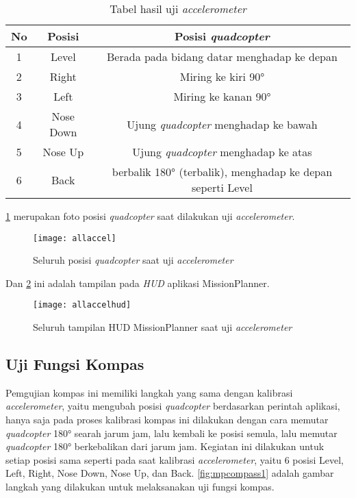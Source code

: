 \begin{table}[H]
	\caption{Tabel hasil uji \textit{accelerometer}}
	\label{tab:accel4}
	\centering
	\begin{tabular}{|c|c|c|}
		\hline
		\textbf{No} & \textbf{Posisi}    & \textbf{Posisi \textit{quadcopter}}                                          \\ \hline
		1  & Level     & Berada pada bidang datar menghadap ke depan                \\ \hline
		2  & Right     & Miring ke kiri 90°                                         \\ \hline
		3  & Left      & Miring ke kanan 90°                                        \\ \hline
		4  & Nose Down & Ujung \textit{quadcopter} menghadap ke bawah                        \\ \hline
		5  & Nose Up   & Ujung \textit{quadcopter} menghadap ke atas                         \\ \hline
		6  & Back      & berbalik 180° (terbalik), menghadap ke depan seperti Level \\ \hline
	\end{tabular}
\end{table}

\cref{fig:allaccel} merupakan foto posisi \textit{quadcopter} saat dilakukan uji \textit{accelerometer}.

\begin{figure}[H]
	\centering
	\texttt{[image: allaccel]}
	\caption{Seluruh posisi \textit{quadcopter} saat uji \textit{accelerometer} }
	\label{fig:allaccel}
\end{figure}

Dan \cref{fig:allaccelhud} ini adalah tampilan pada \textit{HUD} aplikasi MissionPlanner.

\begin{figure}[H]
	\centering
	\texttt{[image: allaccelhud]}
	\caption{Seluruh tampilan HUD MissionPlanner saat uji \textit{accelerometer} }
	\label{fig:allaccelhud}
\end{figure}

\subsection{Uji Fungsi Kompas}
Pemgujian kompas ini memiliki langkah yang sama dengan kalibrasi \textit{accelerometer}, yaitu mengubah posisi \textit{quadcopter} berdasarkan perintah aplikasi, hanya saja pada proses kalibrasi kompas ini dilakukan dengan cara memutar \textit{quadcopter} 180° searah jarum jam, lalu kembali ke posisi semula, lalu memutar \textit{quadcopter} 180° berkebalikan dari jarum jam. Kegiatan ini dilakukan untuk setiap posisi sama seperti pada saat kalibrasi \textit{accelerometer}, yaitu 6 posisi Level, Left, Right, Nose Down, Nose Up, dan Back. \cref{fig:mpcompass1} adalah gambar langkah yang dilakukan untuk melaksanakan uji fungsi kompas.

